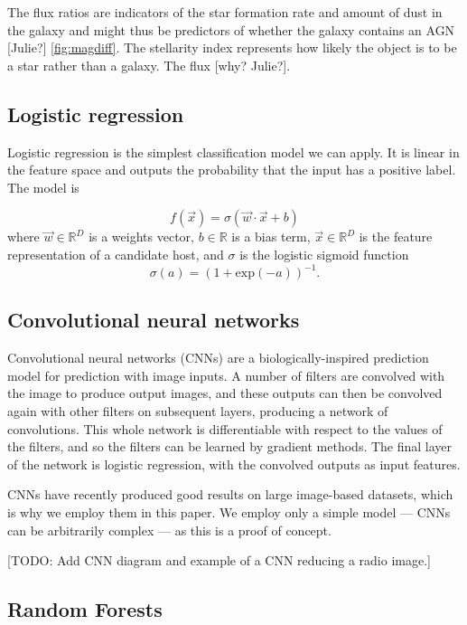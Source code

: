 \documentclass[fleqn,usenatbib,usedcolumn]{mnras}
\begin{document}
    The flux ratios are indicators of the star formation rate and amount of
    dust in the galaxy and might thus be predictors of whether the galaxy
    contains an AGN {[}Julie?{]} \ref{fig:magdiff}. The stellarity index
    represents how likely the object is to be a star rather than a galaxy.
    The flux {[}why? Julie?{]}.

  \subsection{Logistic regression}\label{logistic-regression}

    Logistic regression is the simplest classification model we can apply.
    It is linear in the feature space and outputs the probability that the
    input has a positive label. The model is

    \[
        f(\vec x) = \sigma(\vec w \cdot \vec x + b)
    \] where \(\vec w \in \mathbb{R}^D\) is a weights vector,
    \(b \in \mathbb{R}\) is a bias term, \(\vec x \in \mathbb{R}^D\) is the
    feature representation of a candidate host, and \(\sigma\) is the
    logistic sigmoid function \[
        \sigma(a) = (1 + \mathrm{exp}(-a))^{-1}.
    \]

  \subsection{Convolutional neural
  networks}\label{convolutional-neural-networks}

    Convolutional neural networks (CNNs) are a biologically-inspired
    prediction model for prediction with image inputs. A number of filters
    are convolved with the image to produce output images, and these outputs
    can then be convolved again with other filters on subsequent layers,
    producing a network of convolutions. This whole network is
    differentiable with respect to the values of the filters, and so the
    filters can be learned by gradient methods. The final layer of the
    network is logistic regression, with the convolved outputs as input
    features.

    CNNs have recently produced good results on large image-based datasets,
    which is why we employ them in this paper. We employ only a simple model
    --- CNNs can be arbitrarily complex --- as this is a proof of concept.

    {[}TODO: Add CNN diagram and example of a CNN reducing a radio image.{]}

  \subsection{Random Forests}\label{random-forests}
\end{document}
